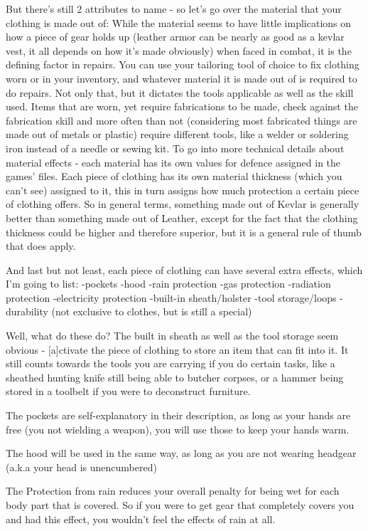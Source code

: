 \documentclass[11pt]{report}
\begin{document}
But there's still 2 attributes to name - so let's go over the material that your clothing is made out of: While the material seems to have little implications on how a piece of gear holds up (leather armor can be nearly as good as a kevlar vest, it all depends on how it's made obviously) when faced in combat, it is the defining factor in repairs. You can use your tailoring tool of choice to fix clothing worn or in your inventory, and whatever material it is made out of is required to do repairs. Not only that, but it dictates the tools applicable as well as the skill used. Items that are worn, yet require fabrications to be made, check against the fabrication skill and more often than not (considering most fabricated things are made out of metals or plastic) require different tools, like a welder or soldering iron instead of a needle or sewing kit.
To go into more technical details about material effects - each material has its own values for defence assigned in the games' files. Each piece of clothing has its own material thickness (which you can't see) assigned to it, this in turn assigns how much protection a certain piece of clothing offers. So in general terms, something made out of Kevlar is generally better than something made out of Leather, except for the fact that the clothing thickness could be higher and therefore superior, but it is a general rule of thumb that does apply.

And last but not least, each piece of clothing can have several extra effects, which I'm going to list:
-pockets
-hood
-rain protection
-gas protection
-radiation protection
-electricity protection
-built-in sheath/holster
-tool storage/loops
-durability (not exclusive to clothes, but is still a special)

Well, what do these do?
The built in sheath as well as the tool storage seem obvious - [a]ctivate the piece of clothing to store an item that can fit into it. It still counts towards the tools you are carrying if you do certain tasks, like a sheathed hunting knife still being able to butcher corpses, or a hammer being stored in a toolbelt if you were to deconstruct furniture.

The pockets are self-explanatory in their description, as long as your hands are free (you not wielding a weapon), you will use those to keep your hands warm.

The hood will be used in the same way, as long as you are not wearing headgear (a.k.a your head is unencumbered)

The Protection from rain reduces your overall penalty for being wet for each body part that is covered. So if you were to get gear that completely covers you and had this effect, you wouldn't feel the effects of rain at all.
\end{document}
